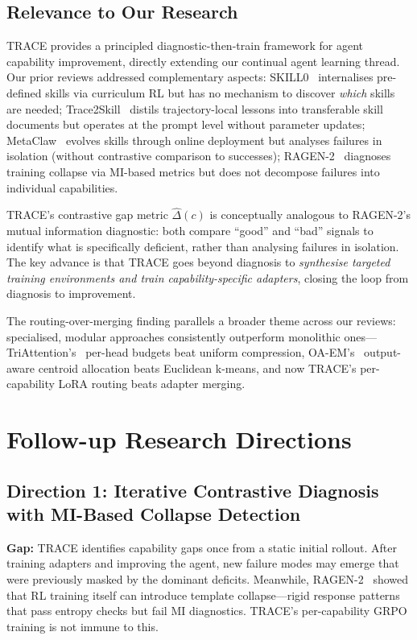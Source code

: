 \documentclass[11pt]{article}
\begin{document}
\subsection{Relevance to Our Research}

TRACE provides a principled diagnostic-then-train framework for agent capability improvement, directly extending our continual agent learning thread. Our prior reviews addressed complementary aspects: SKILL0~\cite{skill0} internalises pre-defined skills via curriculum RL but has no mechanism to discover \textit{which} skills are needed; Trace2Skill~\cite{trace2skill} distils trajectory-local lessons into transferable skill documents but operates at the prompt level without parameter updates; MetaClaw~\cite{metaclaw} evolves skills through online deployment but analyses failures in isolation (without contrastive comparison to successes); RAGEN-2~\cite{ragen2} diagnoses training collapse via MI-based metrics but does not decompose failures into individual capabilities.

TRACE's contrastive gap metric $\hat{\Delta}(c)$ is conceptually analogous to RAGEN-2's mutual information diagnostic: both compare ``good'' and ``bad'' signals to identify what is specifically deficient, rather than analysing failures in isolation. The key advance is that TRACE goes beyond diagnosis to \textit{synthesise targeted training environments and train capability-specific adapters}, closing the loop from diagnosis to improvement.

The routing-over-merging finding parallels a broader theme across our reviews: specialised, modular approaches consistently outperform monolithic ones---TriAttention's~\cite{triattention} per-head budgets beat uniform compression, OA-EM's~\cite{oaem} output-aware centroid allocation beats Euclidean k-means, and now TRACE's per-capability LoRA routing beats adapter merging.

\section{Follow-up Research Directions}

\subsection{Direction 1: Iterative Contrastive Diagnosis with MI-Based Collapse Detection}

\textbf{Gap:} TRACE identifies capability gaps once from a static initial rollout. After training adapters and improving the agent, new failure modes may emerge that were previously masked by the dominant deficits. Meanwhile, RAGEN-2~\cite{ragen2} showed that RL training itself can introduce template collapse---rigid response patterns that pass entropy checks but fail MI diagnostics. TRACE's per-capability GRPO training is not immune to this.
\end{document}
